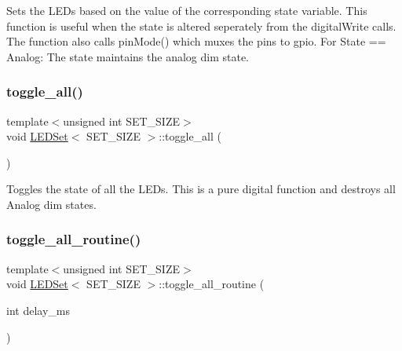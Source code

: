 Sets the L\+E\+Ds based on the value of the corresponding state variable. This function is useful when the state is altered seperately from the digital\+Write calls. The function also calls pin\+Mode() which muxes the pins to gpio. For State == Analog\+: The state maintains the analog dim state. 

\mbox{\label{classLEDSet_ae2bcd287ff637c2600603e83b0981c77}} 
\subsubsection{\texorpdfstring{toggle\+\_\+all()}{toggle\_all()}}
{\footnotesize\ttfamily template$<$unsigned int S\+E\+T\+\_\+\+S\+I\+ZE$>$ \\
void \hyperlink{classLEDSet}{L\+E\+D\+Set}$<$ S\+E\+T\+\_\+\+S\+I\+ZE $>$\+::toggle\+\_\+all (\begin{DoxyParamCaption}{ }\end{DoxyParamCaption})\hspace{0.3cm}{\ttfamily [inline]}}



Toggles the state of all the L\+E\+Ds. This is a pure digital function and destroys all Analog dim states. 

\mbox{\label{classLEDSet_a61cc024950a5b66dff34c449cc73787f}} 
\subsubsection{\texorpdfstring{toggle\+\_\+all\+\_\+routine()}{toggle\_all\_routine()}}
{\footnotesize\ttfamily template$<$unsigned int S\+E\+T\+\_\+\+S\+I\+ZE$>$ \\
void \hyperlink{classLEDSet}{L\+E\+D\+Set}$<$ S\+E\+T\+\_\+\+S\+I\+ZE $>$\+::toggle\+\_\+all\+\_\+routine (\begin{DoxyParamCaption}\item[{int}]{delay\+\_\+ms }\end{DoxyParamCaption})\hspace{0.3cm}{\ttfamily [inline]}}

\mbox{\label{classLEDSet_a6062da843aabdf8fbdcedb70fed00dec}} 
